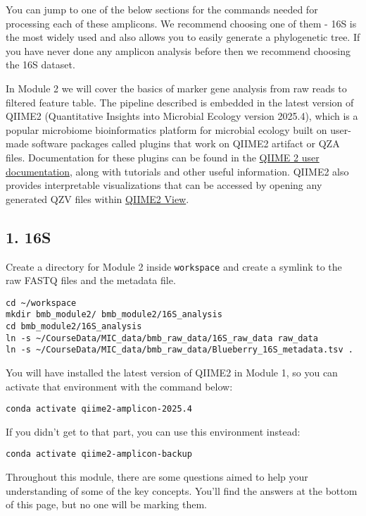 \documentclass[
]{book}
\begin{document}
You can jump to one of the below sections for the commands needed for processing each of these amplicons. We recommend choosing one of them - 16S is the most widely used and also allows you to easily generate a phylogenetic tree. If you have never done any amplicon analysis before then we recommend choosing the 16S dataset.

In Module 2 we will cover the basics of marker gene analysis from raw reads to filtered feature table. The pipeline described is embedded in the latest version of QIIME2 (Quantitative Insights into Microbial Ecology version 2025.4), which is a popular microbiome bioinformatics platform for microbial ecology built on user-made software packages called plugins that work on QIIME2 artifact or QZA files. Documentation for these plugins can be found in the \href{https://qiime2.org/}{QIIME 2 user documentation}, along with tutorials and other useful information. QIIME2 also provides interpretable visualizations that can be accessed by opening any generated QZV files within \href{https://view.qiime2.org/}{QIIME2 View}.

\subsection{1. 16S}\label{s}

Create a directory for Module 2 inside \texttt{workspace} and create a symlink to the raw FASTQ files and the metadata file.

\begin{verbatim}
cd ~/workspace
mkdir bmb_module2/ bmb_module2/16S_analysis
cd bmb_module2/16S_analysis
ln -s ~/CourseData/MIC_data/bmb_raw_data/16S_raw_data raw_data
ln -s ~/CourseData/MIC_data/bmb_raw_data/Blueberry_16S_metadata.tsv .
\end{verbatim}

You will have installed the latest version of QIIME2 in Module 1, so you can activate that environment with the command below:

\begin{verbatim}
conda activate qiime2-amplicon-2025.4
\end{verbatim}

If you didn't get to that part, you can use this environment instead:

\begin{verbatim}
conda activate qiime2-amplicon-backup
\end{verbatim}

Throughout this module, there are some questions aimed to help your understanding of some of the key concepts. You'll find the answers at the bottom of this page, but no one will be marking them.
\end{document}
